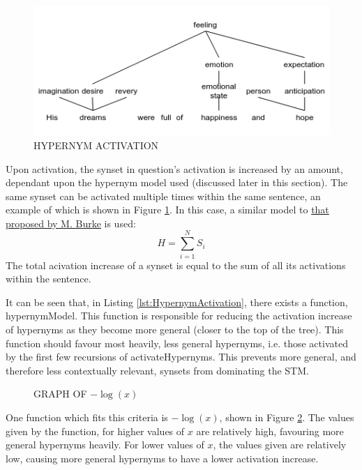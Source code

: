 \documentclass[]{article}
\begin{document}
\begin{figure}[h]
	\includegraphics[scale=0.6]{HypernymActivation.png}
	\caption{HYPERNYM ACTIVATION}
	\label{fig:HypernymAct}
\end{figure}

Upon activation, the synset in question's activation is increased by an amount, dependant upon the hypernym model used (discussed later in this section). The same synset can be activated multiple times within the same sentence, an example of which is shown in Figure \ref{fig:HypernymAct}. In this case, a similar model to \hyperref[sec:MattBurke]{that proposed by M. Burke} \cite{MattBurkePrevious} is used: 
\[H = \sum\limits_{i=1}^N S_i\] 
The total acivation increase of a synset is equal to the sum of all its activations within the sentence. 

It can be seen that, in Listing \ref{lst:HypernymActivation},  there exists a function, hypernymModel. This function is responsible for reducing the activation increase of hypernyms as they become more general (closer to the top of the tree). This function should favour most heavily, less general hypernyms, i.e. those activated by the first few recursions of activateHypernyms. This prevents more general, and therefore less contextually relevant, synsets from dominating the STM. 

\begin{figure}[h]
\caption{GRAPH OF $-\log(x)$}
\label{fig:logGraph}
\end{figure}

One function which fits this criteria is $-\log(x)$, shown in Figure \ref{fig:logGraph}. The values given by the function, for higher values of $x$ are relatively high, favouring more general hypernyms heavily. For lower values of $x$, the values given are relatively low, causing more general hypernyms to have a lower activation increase.
\end{document}
